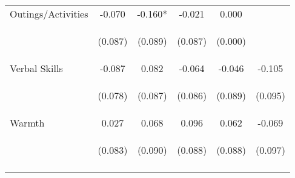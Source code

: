 \begin{tabular}{lccccc}
\noalign{\smallskip}Outings/Activities & -0.070 & -0.160* & -0.021 & 0.000 & \\
 & \begin{footnotesize}(0.087)\end{footnotesize} & \begin{footnotesize}(0.089)\end{footnotesize} & \begin{footnotesize}(0.087)\end{footnotesize} & \begin{footnotesize}(0.000)\end{footnotesize} & \begin{footnotesize}\end{footnotesize}\\
\noalign{\smallskip}Verbal Skills & -0.087 & 0.082 & -0.064 & -0.046 & -0.105\\
 & \begin{footnotesize}(0.078)\end{footnotesize} & \begin{footnotesize}(0.087)\end{footnotesize} & \begin{footnotesize}(0.086)\end{footnotesize} & \begin{footnotesize}(0.089)\end{footnotesize} & \begin{footnotesize}(0.095)\end{footnotesize}\\
\noalign{\smallskip}Warmth & 0.027 & 0.068 & 0.096 & 0.062 & -0.069\\
 & \begin{footnotesize}(0.083)\end{footnotesize} & \begin{footnotesize}(0.090)\end{footnotesize} & \begin{footnotesize}(0.088)\end{footnotesize} & \begin{footnotesize}(0.088)\end{footnotesize} & \begin{footnotesize}(0.097)\end{footnotesize}\\
\noalign{\smallskip}\hline\end{tabular}\\
